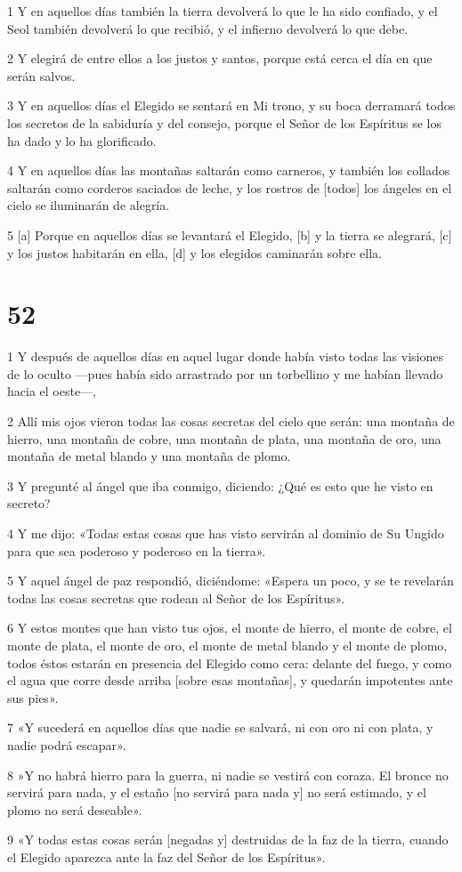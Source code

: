 \par 1 Y en aquellos días también la tierra devolverá lo que le ha sido confiado, y el Seol también devolverá lo que recibió, y el infierno devolverá lo que debe.
\par 2 Y elegirá de entre ellos a los justos y santos, porque está cerca el día en que serán salvos.
\par 3 Y en aquellos días el Elegido se sentará en Mi trono, y su boca derramará todos los secretos de la sabiduría y del consejo, porque el Señor de los Espíritus se los ha dado y lo ha glorificado.
\par 4 Y en aquellos días las montañas saltarán como carneros, y también los collados saltarán como corderos saciados de leche, y los rostros de [todos] los ángeles en el cielo se iluminarán de alegría.
\par 5 [a] Porque en aquellos días se levantará el Elegido, [b] y la tierra se alegrará, [c] y los justos habitarán en ella, [d] y los elegidos caminarán sobre ella.

\chapter{52}

\par 1 Y después de aquellos días en aquel lugar donde había visto todas las visiones de lo oculto —pues había sido arrastrado por un torbellino y me habían llevado hacia el oeste—,
\par 2 Allí mis ojos vieron todas las cosas secretas del cielo que serán: una montaña de hierro, una montaña de cobre, una montaña de plata, una montaña de oro, una montaña de metal blando y una montaña de plomo.
\par 3 Y pregunté al ángel que iba conmigo, diciendo: ¿Qué es esto que he visto en secreto?
\par 4 Y me dijo: «Todas estas cosas que has visto servirán al dominio de Su Ungido para que sea poderoso y poderoso en la tierra».
\par 5 Y aquel ángel de paz respondió, diciéndome: «Espera un poco, y se te revelarán todas las cosas secretas que rodean al Señor de los Espíritus».
\par 6 Y estos montes que han visto tus ojos, el monte de hierro, el monte de cobre, el monte de plata, el monte de oro, el monte de metal blando y el monte de plomo, todos éstos estarán en presencia del Elegido como cera: delante del fuego, y como el agua que corre desde arriba [sobre esas montañas], y quedarán impotentes ante sus pies».
\par 7 «Y sucederá en aquellos días que nadie se salvará, ni con oro ni con plata, y nadie podrá escapar».
\par 8 »Y no habrá hierro para la guerra, ni nadie se vestirá con coraza. El bronce no servirá para nada, y el estaño [no servirá para nada y] no será estimado, y el plomo no será deseable».
\par 9 «Y todas estas cosas serán [negadas y] destruidas de la faz de la tierra, cuando el Elegido aparezca ante la faz del Señor de los Espíritus».

